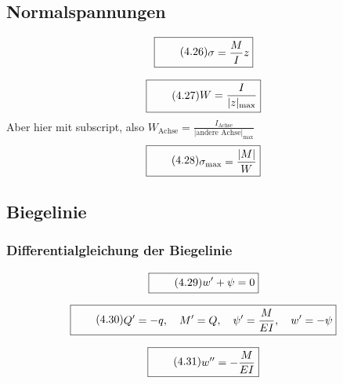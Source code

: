\documentclass[11pt]{article}
\newcommand{\1}{ {\mathds{1}} }
\newcommand{\abs}[1]{\lvert#1\rvert}
\begin{document}
\begin{multicols}{2}
		\subsection{Normalspannungen}

		\begin{equation}
			\boxed{
				\tag{4.26}
				\begin{split}
					\sigma
					=
					\frac{M}{I}
					z
				\end{split}
			}
		\end{equation}
		
		\begin{equation}
			\boxed{
				\tag{4.27}
				\begin{split}
					W
					=
					\frac{I}{\abs{z}_{\text{max}}}
				\end{split}
			}
		\end{equation}
		Aber hier mit subscript, also $\displaystyle W_{\text{Achse}} = \frac{I_{\text{Achse}}}{\abs{\text{andere Achse}}_{\text{max}}}$
		\begin{equation}
			\boxed{
				\tag{4.28}
				\begin{split}
					\sigma_{\text{max}}
					=
					\frac{\abs{M}}{W}
				\end{split}
			}
		\end{equation}
		
		\subsection{Biegelinie}
		\subsubsection{Differentialgleichung der Biegelinie}

		\begin{equation}
			\boxed{
				\tag{4.29}
				\begin{split}
					w' + \psi = 0
				\end{split}
			}
		\end{equation}

		\begin{equation}
			\boxed{
				\tag{4.30}
				\begin{split}
					Q' = -q,\quad M' = Q, \quad \psi' = \frac{M}{E I}, \quad w' = -\psi
				\end{split}
			}
		\end{equation}

		\begin{equation}
			\boxed{
				\tag{4.31}
				\begin{split}
					w'' = -\frac{M}{E I}
				\end{split}
			}
		\end{equation}


\end{multicols}
\end{document}
